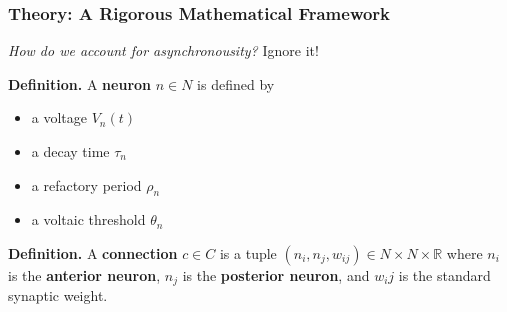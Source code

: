 \documentclass{beamer}
\begin{document}
    \begin{frame}
    \frametitle{Theory: A Rigorous Mathematical Framework}
    \emph{How do we account for asynchronousity?} Ignore it! \\[0.25cm]
\begin{centering}


\end{centering}
 \textbf{Definition.}
  A \textbf{neuron} $n \in N$ is defined by
  \begin{itemize}
    \item a voltage $V_n(t)$
    \item a decay time $\tau_n$
    \item a refactory period $\rho_n$
    \item a voltaic threshold $\theta_n$
  \end{itemize}
  \textbf{Definition.}
  A \textbf{connection} $c \in C$ is a tuple $(n_i, n_j, w_{ij}) \in N \times N \times \mathbb{R}$
  where $n_i$ is  the \textbf{anterior neuron}, $n_j$ is the \textbf{posterior neuron}, and $w_ij$
  is the standard synaptic weight.

    \end{frame}
\end{document}
